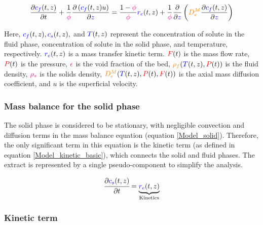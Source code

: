 \documentclass[../Article_Model_Parameters.tex]{subfiles}
\begin{document}
	{\footnotesize
		\begin{equation}
			\label{Model_fluid}
			\frac{\partial {\color{blue}c_f}(t,z)}{\partial t}
			+ \frac{1}{{\color{magenta}\phi}} \frac{\partial \left( {\color{blue}c_f}(t,z) u\right)}{\partial {\color{blue}z}}
			= \frac{1-{\color{magenta}\phi}}{{\color{magenta}\phi}} {\color{blue}r_e}(t,z)
			+ \frac{1}{{\color{magenta}\phi}} \frac{\partial}{\partial {\color{blue}z}} \left( {\color{orange}D^M_e} \frac{\partial {\color{blue}c_f}(t,z)}{\partial {\color{blue}z}} \right)
		\end{equation}
	}
	
	Here, ${\color{blue}c_f}(t,z), {\color{blue}c_s}(t,z),$ and ${\color{blue}T}(t,z)$ represent the concentration of solute in the fluid phase, concentration of solute in the solid phase, and temperature, respectively. ${\color{blue}r_e}(t,z)$ is a mass transfer kinetic term. ${\color{red}F}(t)$ is the mass flow rate, ${\color{red}P}(t)$ is the pressure, ${\color{magenta}\epsilon}$ is the void fraction of the bed, ${\color{orange}\rho_f}({\color{blue}T}(t,z),{\color{red}P}(t))$ is the fluid density, ${\color{magenta}\rho_s}$ is the solids density, ${\color{orange}D^M_e}({\color{blue}T}(t,z),{\color{red}P}(t),{\color{red}F}(t))$ is the axial mass diffusion coefficient, and $u$ is the superficial velocity.
	
	\subsubsection{Mass balance for the solid phase} \label{Mass_balance_solid}
	
	The solid phase is considered to be stationary, with negligible convection and diffusion terms in the mass balance equation (equation \ref{Model_solid}). Therefore, the only significant term in this equation is the kinetic term (as defined in equation \ref{Model_kinetic_basic}), which connects the solid and fluid phases. The extract is represented by a single pseudo-component to simplify the analysis. 
	
	{\footnotesize
		\begin{equation} 
			\label{Model_solid}
					\cfrac{\partial {\color{blue}c_s}(t,z)}{\partial t} = \underbrace{ {\color{blue}r_e}(t,z) }_{\text{Kinetics}}
			\end{equation} }
			
	\subsubsection{Kinetic term} \label{CH: Kinetic}
	
\end{document}
